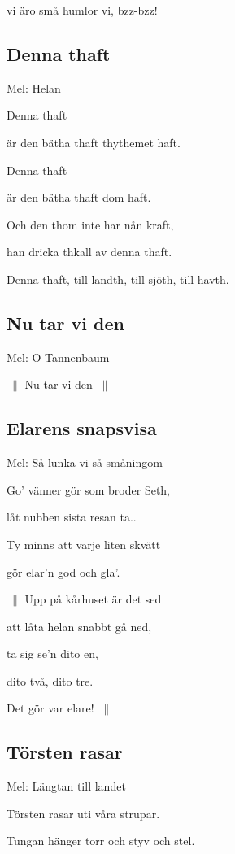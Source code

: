 vi äro små humlor vi, bzz-bzz!

\subsection{\textbf{Denna thaft}}

Mel: Helan\bigskip

Denna thaft

är den bätha thaft thythemet haft.

Denna thaft

är den bätha thaft dom haft.

Och den thom inte har nån kraft,

han dricka thkall av denna thaft.

Denna thaft, till landth, till sjöth, till havth.

\subsection{\textbf{Nu tar vi den}}

Mel: O Tannenbaum\bigskip

$\:\|$ Nu tar vi den $\:\|$\bigskip

\subsection{\textbf{Elarens snapsvisa}}

Mel: Så lunka vi så småningom

Go’ vänner gör som broder Seth,

låt nubben sista resan ta..

Ty minns att varje liten skvätt

gör elar’n god och gla’.\bigskip

$\:\|$ Upp på kårhuset är det sed

att låta helan snabbt gå ned,

ta sig se’n dito en,

dito två, dito tre.

Det gör var elare! $\:\|$\bigskip

\subsection{\textbf{Törsten rasar}}

Mel: Längtan till landet\bigskip


Törsten rasar uti våra strupar.

Tungan hänger torr och styv och stel.

